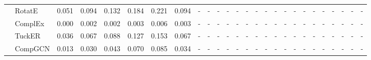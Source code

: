 \begin{table}[p]
{\begin{tabular}{l|l||cccccc||cccccc||cccccc||cccccc}
 & RotatE & 0.051 & 0.094 & 0.132 & 0.184 & 0.221 & 0.094 & - & - & - & - & - & - & - & - & - & - & - & - & - & - & - & - & - & - \\
 & ComplEx & 0.000 & 0.002 & 0.002 & 0.003 & 0.006 & 0.003 & - & - & - & - & - & - & - & - & - & - & - & - & - & - & - & - & - & - \\
 & TuckER & 0.036 & 0.067 & 0.088 & 0.127 & 0.153 & 0.067 & - & - & - & - & - & - & - & - & - & - & - & - & - & - & - & - & - & - \\
 & CompGCN & 0.013 & 0.030 & 0.043 & 0.070 & 0.085 & 0.034 & - & - & - & - & - & - & - & - & - & - & - & - & - & - & - & - & - & - \\
\hline
\end{tabular}%
}
\end{table}
